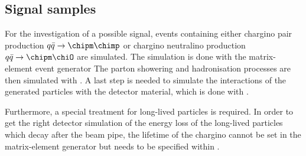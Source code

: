 
\subsection{Signal samples}
\label{sec:SignalSamples}
For the investigation of a possible signal, events containing either chargino pair production $q\bar{q} \rightarrow \chipm \chimp$ or chargino neutralino production $q\bar{q} \rightarrow \chipm \chiO$ are simulated. 
The simulation is done with the matrix-element event generator \madgraph \cite{bib:Madgraph_2014}
The parton showering and hadronisation processes are then simulated with \pythia \cite{bib:Pyhtia6_2006}.
A last step is needed to simulate the interactions of the generated particles with the detector material, which is done with \geant \cite{bib:Geant4_2003,bib:Geant4_2006}.

Furthermore, a special treatment for long-lived particles is required.
In order to get the right detector simulation of the energy loss of the long-lived particles which decay after the beam pipe, the lifetime of the chargino cannot be set in the matrix-element generator but needs to be specified within \geant.


